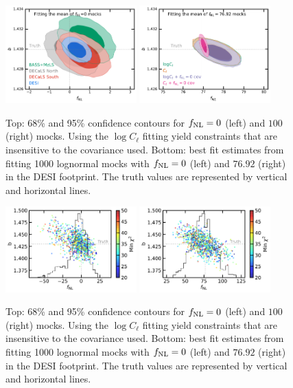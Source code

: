 \begin{figure}
    \centering
    \includegraphics[width=0.45\textwidth]{figures/mcmc_zero.pdf} 
    \includegraphics[width=0.45\textwidth]{figures/mcmc_po100.pdf} 
    \caption{Top: 68\% and 95\% confidence contours for $f_{\rm NL}=0$ (left) and $100$ (right) mocks. Using the $\log C_{\ell}$ fitting yield constraints that are insensitive to the covariance used. Bottom: best fit estimates from fitting 1000 lognormal mocks with $f_{\rm NL}=0$ (left) and $76.92$ (right) in the DESI footprint. The truth values are represented by vertical and horizontal lines.}\label{fig:mcmc_mocks}
\end{figure}

\begin{figure}
    \centering
    \includegraphics[width=0.45\textwidth]{figures/bestfit_zero.pdf} 
    \includegraphics[width=0.45\textwidth]{figures/bestfit_po100.pdf}         
    \caption{Top: 68\% and 95\% confidence contours for $f_{\rm NL}=0$ (left) and $100$ (right) mocks. Using the $\log C_{\ell}$ fitting yield constraints that are insensitive to the covariance used. Bottom: best fit estimates from fitting 1000 lognormal mocks with $f_{\rm NL}=0$ (left) and $76.92$ (right) in the DESI footprint. The truth values are represented by vertical and horizontal lines.}\label{fig:bestfit_mocks}
\end{figure}





